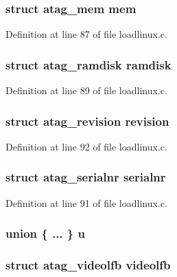 \hypertarget{structatag_a0aba8dc5f020043ea2cb77d6881db48c}{
\subsubsection[{mem}]{\setlength{\rightskip}{0pt plus 5cm}struct {\bf atag\-\_\-mem} {\bf mem}}}\label{structatag_a0aba8dc5f020043ea2cb77d6881db48c}


\-Definition at line 87 of file loadlinux.\-c.

\hypertarget{structatag_a376ebff53c0bc342459800dcbe5143db}{
\subsubsection[{ramdisk}]{\setlength{\rightskip}{0pt plus 5cm}struct {\bf atag\-\_\-ramdisk} {\bf ramdisk}}}\label{structatag_a376ebff53c0bc342459800dcbe5143db}


\-Definition at line 89 of file loadlinux.\-c.

\hypertarget{structatag_ad9f0972cb9739fe2952313cfb7086209}{
\subsubsection[{revision}]{\setlength{\rightskip}{0pt plus 5cm}struct {\bf atag\-\_\-revision} {\bf revision}}}\label{structatag_ad9f0972cb9739fe2952313cfb7086209}


\-Definition at line 92 of file loadlinux.\-c.

\hypertarget{structatag_ac9d79c3e0dfd42492b63d91cf99a39c2}{
\subsubsection[{serialnr}]{\setlength{\rightskip}{0pt plus 5cm}struct {\bf atag\-\_\-serialnr} {\bf serialnr}}}\label{structatag_ac9d79c3e0dfd42492b63d91cf99a39c2}


\-Definition at line 91 of file loadlinux.\-c.

\hypertarget{structatag_aacb06f1a4723ee6a39bd41e95aecd225}{
\subsubsection[{u}]{\setlength{\rightskip}{0pt plus 5cm}union \{ ... \}   {\bf u}}}\label{structatag_aacb06f1a4723ee6a39bd41e95aecd225}
\hypertarget{structatag_acb9829613674a77c810583283cf73210}{
\subsubsection[{videolfb}]{\setlength{\rightskip}{0pt plus 5cm}struct {\bf atag\-\_\-videolfb} {\bf videolfb}}}\label{structatag_acb9829613674a77c810583283cf73210}


